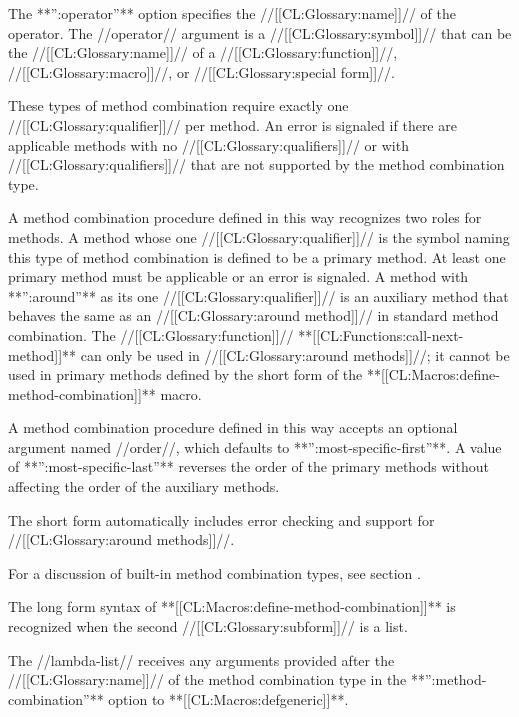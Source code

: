 \itemitem{\bull} The **'':operator''** option specifies the //[[CL:Glossary:name]]// of the operator. The //operator// argument is a //[[CL:Glossary:symbol]]// that can be the //[[CL:Glossary:name]]// of a //[[CL:Glossary:function]]//, //[[CL:Glossary:macro]]//, or //[[CL:Glossary:special form]]//.


\endlist



These types of method combination require exactly one //[[CL:Glossary:qualifier]]// per method. An error is signaled if there are applicable methods with no //[[CL:Glossary:qualifiers]]// or with //[[CL:Glossary:qualifiers]]// that are not supported by the method combination type.

A method combination procedure defined in this way recognizes two roles for methods. A method whose one //[[CL:Glossary:qualifier]]// is the symbol naming this type of method combination is defined to be a primary method. At least one primary method must be applicable or an error is signaled. A method with **'':around''** as its one //[[CL:Glossary:qualifier]]// is an auxiliary method that behaves the same as an //[[CL:Glossary:around method]]// in standard method combination. The //[[CL:Glossary:function]]// **[[CL:Functions:call-next-method]]** can only be used in //[[CL:Glossary:around methods]]//; it cannot be used in primary methods defined by the short form of the **[[CL:Macros:define-method-combination]]** macro.

A method combination procedure defined in this way accepts an optional argument named //order//, which defaults to **'':most-specific-first''**. A value of **'':most-specific-last''** reverses the order of the primary methods without affecting the order of the auxiliary methods.

The short form automatically includes error checking and support for //[[CL:Glossary:around methods]]//.

For a discussion of built-in method combination types, see section {\secref\BuiltInMethCombTypes}.


The long form syntax of **[[CL:Macros:define-method-combination]]** is recognized when the second //[[CL:Glossary:subform]]// is a list.

The //lambda-list// receives any arguments provided after the //[[CL:Glossary:name]]// of the method combination type in the **'':method-combination''** option to **[[CL:Macros:defgeneric]]**.

